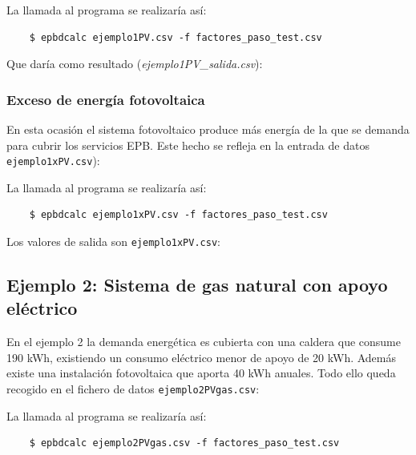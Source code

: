 \documentclass[10pt,notitlepage,oneside,a4paper]{article}
\begin{document}

La llamada al programa se realizaría así:

\begin{verbatim}
    $ epbdcalc ejemplo1PV.csv -f factores_paso_test.csv
\end{verbatim}

Que daría como resultado (\textit{ejemplo1PV\_salida.csv}):


\subsubsection{Exceso de energía fotovoltaica}

En esta ocasión el sistema fotovoltaico produce más energía de la que se demanda para cubrir los servicios EPB. Este hecho se refleja en la entrada de datos \texttt{ejemplo1xPV.csv}):


La llamada al programa se realizaría así:

\begin{verbatim}
    $ epbdcalc ejemplo1xPV.csv -f factores_paso_test.csv
\end{verbatim}

Los valores de salida son \texttt{ejemplo1xPV.csv}:


\subsection{Ejemplo 2: Sistema de gas natural con apoyo eléctrico}
En el ejemplo 2 la demanda energética es cubierta con una caldera que consume 190 kWh, existiendo un consumo eléctrico menor de apoyo de 20 kWh. Además existe una instalación fotovoltaica que aporta 40 kWh anuales. Todo ello queda recogido en el fichero de datos \texttt{ejemplo2PVgas.csv}:


La llamada al programa se realizaría así:

\begin{verbatim}
    $ epbdcalc ejemplo2PVgas.csv -f factores_paso_test.csv
\end{verbatim}
\end{document}
